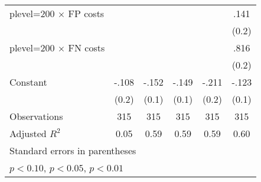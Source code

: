 \begin{table}[htbp]
\begin{tabular}{l*{5}{c}}
plevel=200 $\times$ FP costs&                  &                  &                  &                  &     .141         \\
                &                  &                  &                  &                  &    (0.2)         \\
plevel=200 $\times$ FN costs&                  &                  &                  &                  &     .816\sym{***}\\
                &                  &                  &                  &                  &    (0.2)         \\
Constant        &    -.108         &    -.152\sym{*}  &    -.149\sym{*}  &    -.211         &    -.123         \\
                &    (0.2)         &    (0.1)         &    (0.1)         &    (0.2)         &    (0.1)         \\
\hline
Observations    &      315         &      315         &      315         &      315         &      315         \\
Adjusted \(R^{2}\)&     0.05         &     0.59         &     0.59         &     0.59         &     0.60         \\
\hline\hline
\multicolumn{6}{l}{\footnotesize Standard errors in parentheses}\\
\multicolumn{6}{l}{\footnotesize \sym{*} \(p<0.10\), \sym{**} \(p<0.05\), \sym{***} \(p<0.01\)}\\
\end{tabular}
\end{table}
